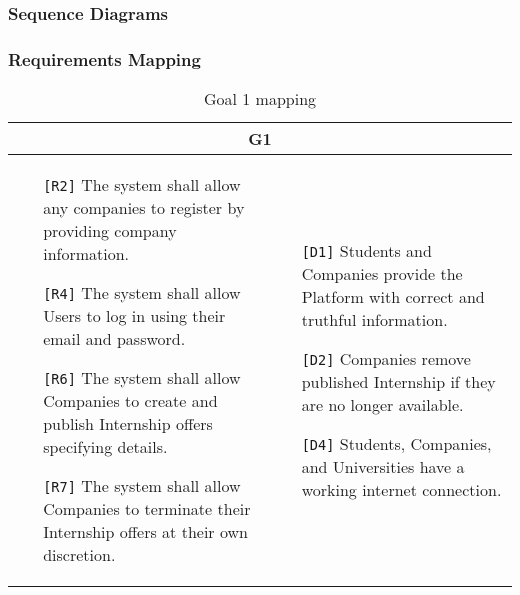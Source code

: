 \subsubsection{Sequence Diagrams}
\subsubsection{Requirements Mapping}

\begin{table}[H]
    \centering
    \begin{tabular}{|p{7cm}|p{7cm}|}
         \hline
        \multicolumn{2}{|c|}{G1} \\
        \hline
        \begin{itemize}
            \item[\texttt{[R2]}] The system shall allow any companies to register by providing company information.
            \item[\texttt{[R4]}] The system shall allow Users to log in using their email and password.
            \item[\texttt{[R6]}] The system shall allow Companies to create and publish Internship offers specifying details.
            \item[\texttt{[R7]}]The system shall allow Companies to terminate their Internship offers at their own discretion.
        \end{itemize} & 
        \begin{itemize}
            \item[\texttt{[D1]}] Students and Companies provide the Platform with correct and truthful information.
            \item[\texttt{[D2]}] Companies remove published Internship if they are no longer available.
            \item[\texttt{[D4]}] Students, Companies, and Universities have a working internet connection.
        \end{itemize} \\ \hline
    \end{tabular}
    \caption{Goal 1 mapping}
    \label{tab:G1}
\end{table}

